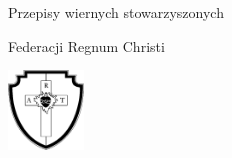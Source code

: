 ﻿\begin{center}

\thispagestyle{empty}

\vspace*{3cm}

{\Huge Przepisy wiernych stowarzyszonych}

{\Huge Federacji Regnum Christi}

\vspace*{2cm}

\includegraphics[width=2cm]{rc-logo-bw-712-755}

\end{center}

\cleardoublepage


\pagestyle{plain}

\cleardoublepage

